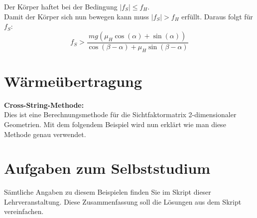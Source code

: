 \documentclass[a4paper,12p]{article}
\begin{document}
\newline
Der Körper haftet bei der Bedingung \( |f_{S}|\leq f_{H}\).\\
Damit der Körper sich nun bewegen kann muss \(|f_{S}| > f_{H}\) erfüllt. Daraus folgt für \(f_{S}\):
\[
	f_{S} > \frac{mg(\mu_{H}\cos(\alpha) + \sin(\alpha))}{\cos(\beta - \alpha) + \mu_{H}\sin(\beta - \alpha)}
\] 

\section{Wärmeübertragung}
\textbf{Cross-String-Methode:} \\
Dies ist eine Berechnungsmethode für die Sichtfaktormatrix 2-dimensionaler Geometrien. Mit dem folgendem Beispiel wird nun erklärt wie man diese Methode genau verwendet. \\


\renewcommand\thesection{\Alph{section}} %
\setcounter{section}{1} %
\section{Aufgaben zum Selbststudium}
Sämtliche Angaben zu diesem Beispielen finden Sie im Skript dieser Lehrveranstaltung. Diese Zusammenfassung soll die Lösungen aus dem Skript vereinfachen.
\newpage
\end{document}
